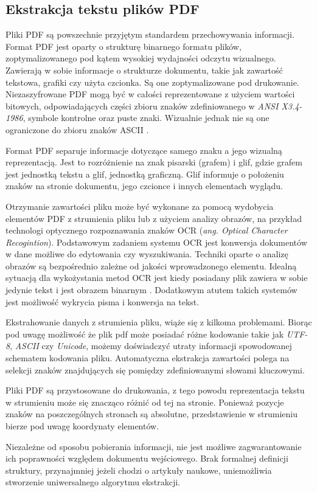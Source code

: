 \documentclass[12pt,a4paper,twoside]{article}
\begin{document}
\subsection{Ekstrakcja tekstu plików PDF}
Pliki PDF są powszechnie przyjętym standardem przechowywania informacji. Format PDF jest oparty o strukturę binarnego formatu plików, zoptymalizowanego pod kątem wysokiej wydajności odczytu wizualnego. Zawierają w sobie informacje o strukturze dokumentu, takie jak zawartość tekstowa, grafiki czy użyta czcionka. Są one zoptymalizowane pod drukowanie. Niezaszyfrowane PDF mogą być w całości reprezentowane z użyciem wartości bitowych, odpowiadających części zbioru znaków zdefiniowanego w \textit{ANSI X3.4-1986}, symbole kontrolne oraz puste znaki. Wizualnie jednak nie są one ograniczone do zbioru znaków ASCII \cite{ISO32000}.\par
Format PDF separuje informacje dotyczące samego znaku a jego wizualną reprezentacją. Jest to rozróżnienie na znak pisarski (grafem) i glif, gdzie grafem jest jednostką tekstu a glif, jednostką graficzną. Glif informuje o położeniu znaków na stronie dokumentu, jego czcionce i innych elementach wyglądu. \par
Otrzymanie zawartości pliku może być wykonane za pomocą wydobycia elementów PDF z strumienia pliku lub z użyciem analizy obrazów, na przykład technologi optycznego rozpoznawania znaków OCR (\textit{ang. Optical Character Recogintion}). 
Podstawowym zadaniem systemu OCR jest konwersja dokumentów w dane możliwe do edytowania czy wyszukiwania. Techniki oparte o analizę obrazów są bezpośrednio zależne od jakości wprowadzonego elementu. Idealną sytuacją dla wykożystania metod OCR jest kiedy posiadany plik zawiera w sobie jedynie tekst i jest obrazem binarnym \cite{mithe2013optical}. Dodatkowym atutem takich systemów jest możliwość wykrycia pisma i konwersja na tekst.\par
Ekstrahowanie danych z strumienia pliku, wiąże się z kilkoma problemami. Biorąc pod uwagę możliwość że plik pdf może posiadać różne kodowanie takie jak \textit{UTF-8}, \textit{ASCII} czy \textit{Unicode}, możemy doświadczyć utraty informacji spowodowanej schematem kodowania pliku. Automatyczna ekstrakcja zawartości polega na selekcji znaków znajdujących się pomiędzy zdefiniowanymi słowami kluczowymi. \par
Pliki PDF są przystosowane do drukowania, z tego powodu reprezentacja tekstu w strumieniu może się znacząco różnić od tej na stronie. Ponieważ pozycje znaków na poszczególnych stronach są absolutne, przedstawienie w strumieniu bierze pod uwagę koordynaty elementów.\par
Niezależne od sposobu pobierania informacji, nie jest możliwe zagwarantowanie ich poprawności względem dokumentu wejściowego. Brak formalnej definicji struktury, przynajmniej jeżeli chodzi o artykuły naukowe, uniemożliwia stworzenie uniwersalnego algorytmu ekstrakcji.
\end{document}
